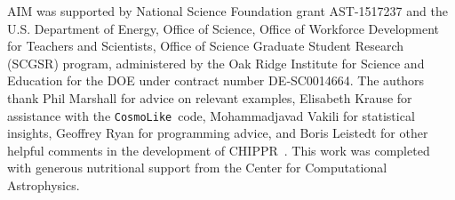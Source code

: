 \documentclass[iop]{emulateapj}
\newcommand{\project}[1]{{\textsc{#1}}~}
\newcommand{\Chippr}{\project{CHIPPR}}
\newcommand{\repo}[1]{{\texttt{#1}}~}
\newcommand{\cosmolike}{\repo{CosmoLike}}
\begin{document}
\begin{appendices}



\end{appendices}

\begin{acknowledgements}
AIM was supported by National Science Foundation grant AST-1517237 and the U.S. 
Department of Energy, Office of Science, Office of Workforce Development for 
Teachers and Scientists, Office of Science Graduate Student Research (SCGSR) 
program, administered by the Oak Ridge Institute for Science and Education for 
the DOE under contract number DE‐SC0014664.
The authors thank Phil Marshall for advice on relevant examples, Elisabeth 
Krause for assistance with the \cosmolike code, Mohammadjavad Vakili for 
statistical insights, Geoffrey Ryan for programming advice, and Boris Leistedt 
for other helpful comments in the development of \Chippr.
This work was completed with generous nutritional support from the Center for 
Computational Astrophysics.
\end{acknowledgements}



\end{document}
